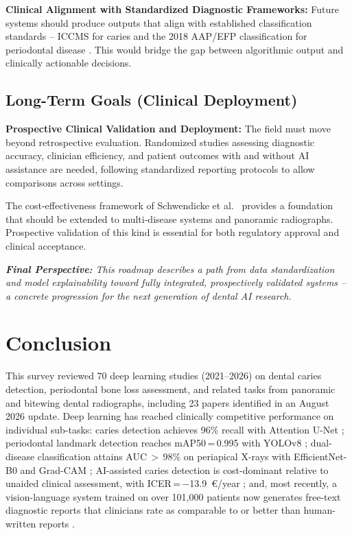 \documentclass[conference]{IEEEtran}
\begin{document}
\textbf{Clinical Alignment with Standardized Diagnostic Frameworks:}
Future systems should produce outputs that align with established
classification standards -- ICCMS for caries and the 2018 AAP/EFP
classification for periodontal disease \cite{chmielewski20252018}. This
would bridge the gap between algorithmic output and clinically
actionable decisions.

\subsection{Long-Term Goals (Clinical Deployment)}

\textbf{Prospective Clinical Validation and Deployment:} The field must
move beyond retrospective evaluation. Randomized studies assessing
diagnostic accuracy, clinician efficiency, and patient outcomes with
and without AI assistance are needed, following standardized reporting
protocols to allow comparisons across settings.

The cost-effectiveness framework of Schwendicke et al.\
\cite{schwendicke2021cost} provides a foundation that should be extended
to multi-disease systems and panoramic radiographs. Prospective
validation of this kind is essential for both regulatory approval and
clinical acceptance.

\vspace{4pt}
\noindent\textit{\textbf{Final Perspective:} This roadmap describes a
path from data standardization and model explainability toward fully
integrated, prospectively validated systems -- a concrete progression
for the next generation of dental AI research.}
\section{Conclusion}
\label{sec:conclusion}

This survey reviewed 70 deep learning studies (2021--2026) on dental
caries detection, periodontal bone loss assessment, and related tasks
from panoramic and bitewing dental radiographs, including 23 papers
identified in an August 2026 update. Deep learning has reached
clinically competitive performance on individual sub-tasks: caries
detection achieves 96\% recall with Attention
U-Net \cite{pornprasertsuk2025clinical};
periodontal landmark detection reaches mAP50\,=\,0.995 with YOLOv8
\cite{jundaeng2025advanced}; dual-disease classification attains
AUC\,$>$\,98\% on periapical X-rays with EfficientNet-B0 and Grad-CAM
\cite{chen2023deep}; AI-assisted caries detection is cost-dominant
relative to unaided clinical assessment, with
ICER\,=\,$-$13.9~\euro/year \cite{schwendicke2021cost}; and, most
recently, a vision-language system trained on over 101,000 patients
now generates free-text diagnostic reports that clinicians rate as
comparable to or better than human-written reports
\cite{zhu2026dentfound}.
\end{document}

